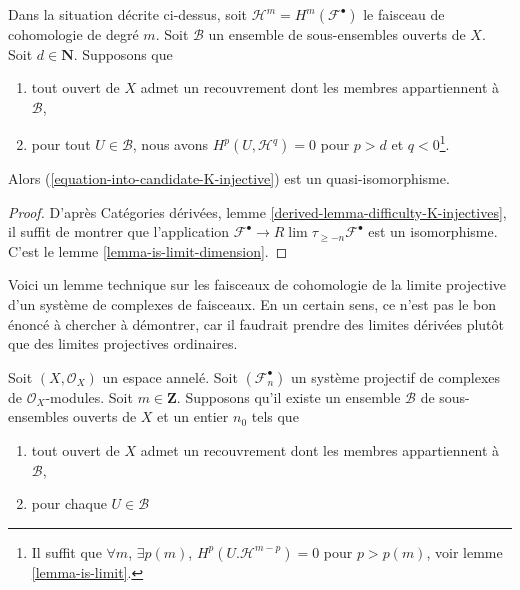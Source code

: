 {\begin{lemma}
Dans la situation décrite ci-dessus, soit $\mathcal{H}^m = H^m(\mathcal{F}^\bullet)$ le faisceau de cohomologie de degré $m$. Soit $\mathcal{B}$ un ensemble de sous-ensembles ouverts de $X$. Soit $d \in \mathbf{N}$. Supposons que

\begin{enumerate}

\item tout ouvert de $X$ admet un recouvrement dont les membres appartiennent à $\mathcal{B}$,
\item pour tout $U \in \mathcal{B}$, nous avons $H^p(U, \mathcal{H}^q) = 0$
pour $p > d$ et $q < 0$\footnote{Il suffit que
$\forall m$, $\exists p(m)$, $H^p(U. \mathcal{H}^{m - p}) = 0$ pour
$p > p(m)$, voir lemme \ref{lemma-is-limit}.}.

\end{enumerate}

Alors (\ref{equation-into-candidate-K-injective}) est un quasi-isomorphisme.

\end{lemma}

\begin{proof}
D'après Catégories dérivées, lemme \ref{derived-lemma-difficulty-K-injectives}, il suffit de montrer que l'application $\mathcal{F}^\bullet \to R\lim \tau_{\geq -n} \mathcal{F}^\bullet$ est un isomorphisme. C'est le lemme \ref{lemma-is-limit-dimension}.
\end{proof}

\noindent
Voici un lemme technique sur les faisceaux de cohomologie de la limite projective d'un système de complexes de faisceaux. En un certain sens, ce n'est pas le bon énoncé à chercher à démontrer, car il faudrait prendre des limites dérivées plutôt que des limites projectives ordinaires.

\begin{lemma}

\label{lemma-inverse-limit-complexes}

Soit $(X, \mathcal{O}_X)$ un espace annelé. Soit $(\mathcal{F}_n^\bullet)$
un système projectif de complexes de $\mathcal{O}_X$-modules. Soit $m \in \mathbf{Z}$. Supposons qu'il existe un ensemble $\mathcal{B}$ de sous-ensembles ouverts de $X$ et un entier $n_0$ tels que

\begin{enumerate}

\item tout ouvert de $X$ admet un recouvrement dont les membres appartiennent à $\mathcal{B}$,
\item pour chaque $U \in \mathcal{B}$


\end{enumerate}
\end{lemma}}
